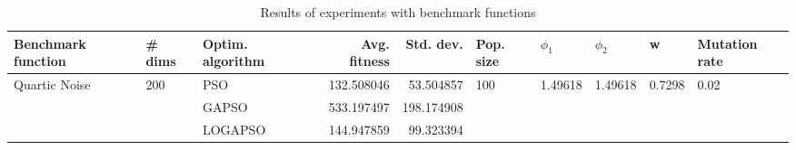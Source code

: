 \begin{table}
\centering
\caption{Results of experiments with benchmark functions}
\begin{tabular}{lllrrlllll}
\toprule
            Benchmark function &              \# dims & Optim. algorithm &  Avg. fitness &  Std. dev. &            Pop. size &               $\phi_{1}$ &               $\phi_{2}$ &                       w &         Mutation rate \\
\midrule
\multirow{3}{*}{Quartic Noise} & \multirow{3}{*}{200} &              PSO &    132.508046 &  53.504857 & \multirow{3}{*}{100} & \multirow{3}{*}{1.49618} & \multirow{3}{*}{1.49618} & \multirow{3}{*}{0.7298} & \multirow{3}{*}{0.02} \\
                               &                      &            GAPSO &    533.197497 & 198.174908 &                      &                          &                          &                         &                       \\
                               &                      &          LOGAPSO &    144.947859 &  99.323394 &                      &                          &                          &                         &                       \\
\bottomrule
\end{tabular}
\end{table}
